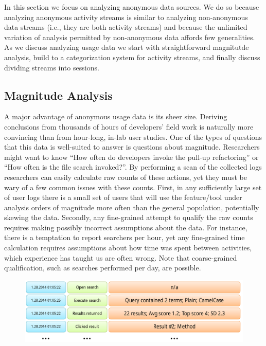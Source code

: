 In this section we focus on analyzing anonymous data sources. We do so because analyzing anonymous activity streams is similar to analyzing non-anonymous data streams (i.e., they are both activity streams) and because the unlimited variation of analysis permitted by non-anonymous data affords few generalities. As we discuss analyzing usage data we start with straightforward magnitutde analysis, build to a categorization system for activity streams, and finally discuss dividing streams into sessions. 


\subsection{Magnitude Analysis}

A major advantage of anonymous usage data is its sheer size. Deriving conclusions from thousands of hours of developers' field work is naturally more convincing than from hour-long, in-lab user studies. One of the types of questions that this data is well-suited to answer is questions about magnitude. Researchers might want to know ``How often do developers invoke the pull-up refactoring'' or ``How often is the file search invoked?''. By performing a scan of the collected logs researchers can easily calculate raw counts of these actions, yet they must be wary of a few common issues with these counts. First, in any sufficiently large set of user logs there is a small set of users that will use the feature/tool under analysis orders of magnitude more often than the general population, potentially skewing the data. Secondly, any fine-grained attempt to qualify the raw counts requires making possibly incorrect assumptions about the data. For instance, there is a temptation to report searchers per hour, yet any fine-grained time calculation requires assumptions about how time was spent between activities, which experience has taught us are often wrong. Note that coarse-grained qualification, such as searches performed per day, are possible.   

\begin{figure}[t]
 \centering
\includegraphics[width=1\columnwidth]{Graphics/activityLogActual.pdf}
\label{fig:actual}
\end{figure}



